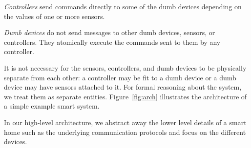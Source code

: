 \documentclass{article}
\begin{document}
\textit{Controllers} send commands directly to some of the dumb devices depending on the values of one or more sensors. 

\textit{Dumb devices} do not send messages to other dumb devices, sensors, or controllers. They atomically execute the commands sent to them by any controller. 

It is not necessary for the sensors, controllers, and dumb devices to be physically separate from each other: 
a controller may be fit to a dumb device or a dumb device may have sensors attached to it. For formal reasoning about the system, we treat them as separate entities. Figure~\ref{fig:arch} illustrates the architecture of a simple example smart system. 

In our high-level architecture, we abstract away the lower level details of a smart home such as the underlying communication protocols and focus on the different devices.
\end{document}
